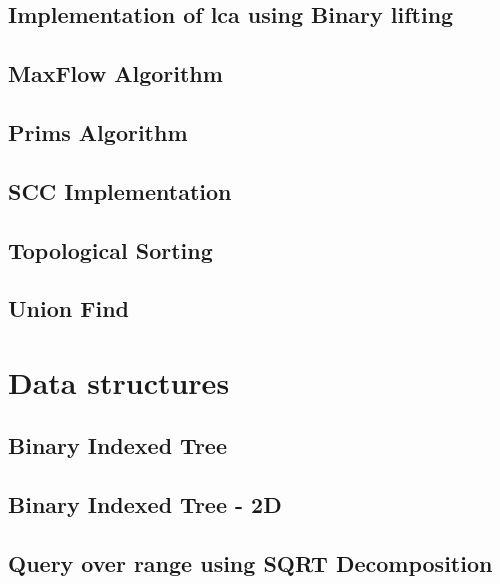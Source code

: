 \subsection{Implementation of lca using Binary lifting}
\raggedbottom
\hrulefill
\subsection{MaxFlow Algorithm}
\raggedbottom
\hrulefill
\subsection{Prims Algorithm}
\raggedbottom
\hrulefill
\subsection{SCC Implementation}
\raggedbottom
\hrulefill
\subsection{Topological Sorting}
\raggedbottom
\hrulefill
\subsection{Union Find}
\raggedbottom
\hrulefill

\section{Data structures}
\subsection{Binary Indexed Tree}
\raggedbottom
\hrulefill
\subsection{Binary Indexed Tree - 2D}
\raggedbottom
\hrulefill
\subsection{Query over range using SQRT Decomposition}
\raggedbottom
\hrulefill
